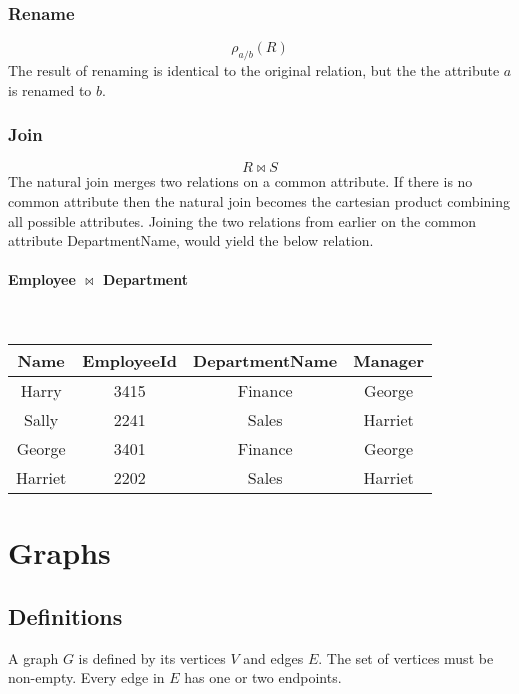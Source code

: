 \documentclass[a4paper, 10pt]{article}
\begin{document}
\subsubsection{Rename}
\[ \rho_{a/b}(R) \]
The result of renaming is identical to the original relation, but the the attribute \(a\) is renamed to \(b\).
\subsubsection{Join}
\[ R\Join S \]
The natural join merges two relations on a common attribute. If there is no common attribute then the natural join becomes the cartesian product combining all possible attributes. Joining the two relations from earlier on the common attribute DepartmentName, would yield the below relation.
\paragraph{Employee \(\Join\) Department}\mbox{}\\
\begin{tabular}{| c | c | c | c |}
    \hline
    Name   & EmployeeId & DepartmentName & Manager \\
    \hline
    Harry   & 3415      & Finance        & George  \\
    Sally   & 2241      & Sales          & Harriet \\
    George  & 3401      & Finance        & George  \\
    Harriet & 2202      & Sales          & Harriet \\
    \hline
\end{tabular}

\newpage
\section{Graphs}

\subsection{Definitions}
A graph \(G\) is defined by its vertices \(V\) and edges \(E\). The set of vertices must be non-empty. Every edge in \(E\) has one or two endpoints.
\end{document}
